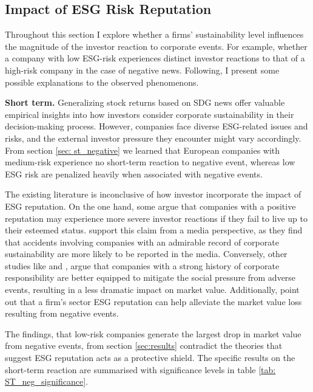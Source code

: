 \subsection{Impact of ESG Risk Reputation} \label{ESG_reputation}

Throughout this section I explore whether a firms' sustainability level influences the magnitude of the investor reaction to corporate events. For example, whether a company with low ESG-risk experiences distinct investor reactions to that of a high-risk company in the case of negative news. Following, I present some possible explanations to the observed phenomenons.     

\textbf{Short term.} Generalizing stock returns based on SDG news offer valuable empirical insights into how investors consider corporate sustainability in their decision-making process. However, companies face diverse ESG-related issues and risks, and the external investor pressure they encounter might vary accordingly. From section \ref{sec: st_negative} we learned that European companies with medium-risk experience no short-term reaction to negative event, whereas low ESG risk are penalized heavily when associated with negative events.  

The existing literature is inconclusive of how investor incorporate the impact of ESG reputation. On the one hand, some argue that companies with a positive reputation may experience  more severe investor reactions if they fail to live up to their esteemed status. \cite{noNewsgoodnews} support this claim from a media perspective, as they find that accidents involving companies with an admirable record of corporate sustainability are more likely to be reported in the media. Conversely, other studies like \cite{flammer2013corporate} and \cite{godfrey2009relationship}, argue that companies with a strong history of corporate responsibility are better equipped to mitigate the social pressure from adverse events, resulting in a less dramatic impact on market value. Additionally, \cite{Blancard_ESG_sentiment} point out that a firm's sector ESG reputation can help alleviate the market value loss resulting from negative events.  

The findings, that low-risk companies generate the largest drop in market value from negative events, from section \ref{sec:results} contradict the theories that suggest ESG reputation acts as a protective shield. The specific results on the short-term reaction are summarised with significance levels in table \ref{tab: ST_neg_significance}.

